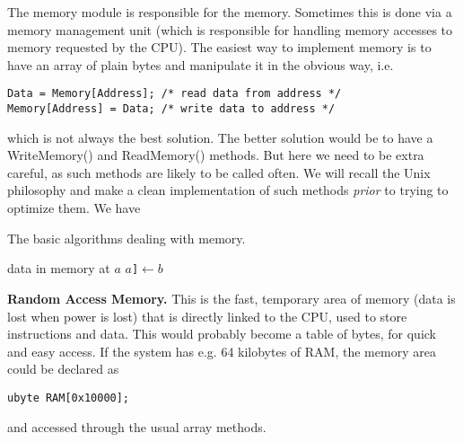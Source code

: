 
The memory module is responsible for the memory. Sometimes this
is done via a memory management unit (which is responsible for
handling memory accesses to memory requested by the CPU). The
easiest way to implement memory is to have an array of plain
bytes and manipulate it in the obvious way, i.e.
\begin{Verbatim}
Data = Memory[Address]; /* read data from address */
Memory[Address] = Data; /* write data to address */
\end{Verbatim}
\noindent which is not always the best solution. The better
solution would be to have a {\sc WriteMemory()} and {\sc ReadMemory()} methods.
But here we need to be extra careful, as such methods are likely
to be called often. We will recall the Unix philosophy and make a
clean implementation of such methods \emph{prior} to trying to
optimize them. We have

\begin{algorithm}[H]
\caption{The basic algorithms dealing with memory.}
\begin{algorithmic}[1]
\label{alg:readMemory}
\State \Return data in memory at $a$
\EndProcedure
\Statex
{}\label{alg:writeMemory}
\State {\tt Memory[}$a${\tt]}$\gets b$
\EndProcedure
\end{algorithmic}
\end{algorithm}

\noindent\textbf{Random Access Memory.} This is the fast,
temporary area of memory (data is lost when power is lost) that
is directly linked to the CPU, used to store instructions and
data. This would probably become a table of bytes, for quick and
easy access. If the system has e.g. 64 kilobytes of RAM, the
memory area could be declared as
\begin{Verbatim}
ubyte RAM[0x10000];
\end{Verbatim}
\noindent and accessed through the usual array methods.
